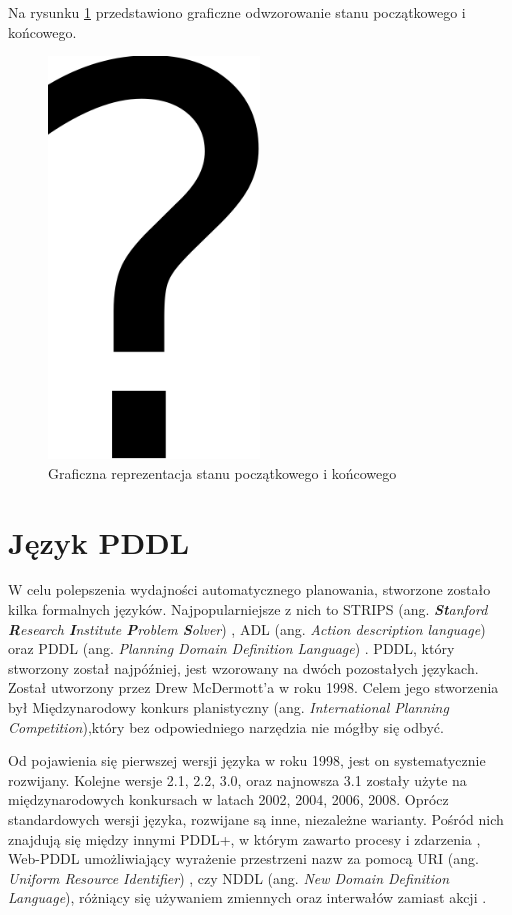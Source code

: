 Na rysunku \ref{fig:automatyczne-planowanie} przedstawiono graficzne odwzorowanie stanu początkowego i końcowego.
\begin{figure}[h!]
    \centering
    \includegraphics[width=0.5\textwidth]{img/rys2,1}
    \caption{Graficzna reprezentacja stanu początkowego i końcowego}
    \label{fig:automatyczne-planowanie}
\end{figure}


\section{Język PDDL}
W celu polepszenia wydajności automatycznego planowania, stworzone zostało kilka formalnych języków. Najpopularniejsze z nich to STRIPS (ang. \textit{\textbf{St}anford \textbf{R}esearch \textbf{I}nstitute \textbf{P}roblem \textbf{S}olver}) , ADL (ang. \textit{Action description language})  oraz PDDL (ang. \textit{Planning Domain Definition Language}) . PDDL, który stworzony został najpóźniej, jest wzorowany na dwóch pozostałych językach. Został utworzony przez Drew McDermott'a w roku 1998. Celem jego stworzenia był Międzynarodowy konkurs planistyczny (ang. \textit{International Planning Competition}),który bez odpowiedniego narzędzia nie mógłby się odbyć.

Od pojawienia się pierwszej wersji języka w roku 1998, jest on systematycznie rozwijany. Kolejne wersje 2.1, 2.2, 3.0, oraz najnowsza 3.1 zostały użyte na międzynarodowych konkursach w latach 2002, 2004, 2006, 2008. Oprócz standardowych wersji języka, rozwijane są inne, niezależne warianty. Pośród nich znajdują się między innymi PDDL+, w którym zawarto procesy i zdarzenia , Web-PDDL umożliwiający wyrażenie przestrzeni nazw za pomocą URI (ang. \textit{Uniform Resource Identifier}) , czy NDDL (ang. \textit{New Domain Definition Language}), różniący się używaniem zmiennych oraz interwałów zamiast akcji .

